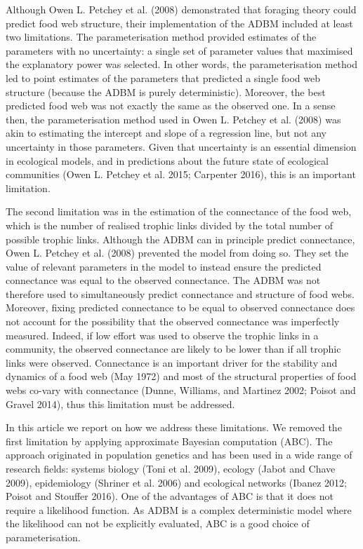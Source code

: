 \documentclass{article}
\begin{document}
Although Owen L. Petchey et al. (2008) demonstrated that foraging theory
could predict food web structure, their implementation of the ADBM
included at least two limitations. The parameterisation method provided
estimates of the parameters with no uncertainty: a single set of
parameter values that maximised the explanatory power was selected. In
other words, the parameterisation method led to point estimates of the
parameters that predicted a single food web structure (because the ADBM
is purely deterministic). Moreover, the best predicted food web was not
exactly the same as the observed one. In a sense then, the
parameterisation method used in Owen L. Petchey et al. (2008) was akin
to estimating the intercept and slope of a regression line, but not any
uncertainty in those parameters. Given that uncertainty is an essential
dimension in ecological models, and in predictions about the future
state of ecological communities (Owen L. Petchey et al. 2015; Carpenter
2016), this is an important limitation.

The second limitation was in the estimation of the connectance of the
food web, which is the number of realised trophic links divided by the
total number of possible trophic links. Although the ADBM can in
principle predict connectance, Owen L. Petchey et al. (2008) prevented
the model from doing so. They set the value of relevant parameters in
the model to instead ensure the predicted connectance was equal to the
observed connectance. The ADBM was not therefore used to simultaneously
predict connectance and structure of food webs. Moreover, fixing
predicted connectance to be equal to observed connectance does not
account for the possibility that the observed connectance was
imperfectly measured. Indeed, if low effort was used to observe the
trophic links in a community, the observed connectance are likely to be
lower than if all trophic links were observed. Connectance is an
important driver for the stability and dynamics of a food web (May 1972)
and most of the structural properties of food webs co-vary with
connectance (Dunne, Williams, and Martinez 2002; Poisot and Gravel
2014), thus this limitation must be addressed.

In this article we report on how we address these limitations. We
removed the first limitation by applying approximate Bayesian
computation (ABC). The approach originated in population genetics and
has been used in a wide range of research fields: systems biology (Toni
et al. 2009), ecology (Jabot and Chave 2009), epidemiology (Shriner et
al. 2006) and ecological networks (Ibanez 2012; Poisot and Stouffer
2016). One of the advantages of ABC is that it does not require a
likelihood function. As ADBM is a complex deterministic model where the
likelihood can not be explicitly evaluated, ABC is a good choice of
parameterisation.
\end{document}
